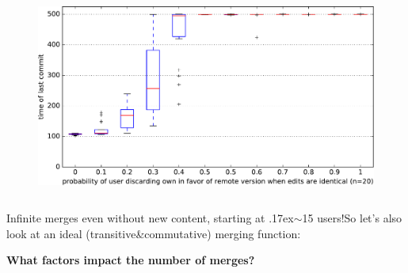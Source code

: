 \documentclass[final,hyperref={pdfpagelabels=false}]{beamer}
\begin{document}
\begin{frame}
\begin{columns}
\begin{column}{.9\textwidth}
\begin{columns}
\begin{column}{.3\textwidth}
\begin{figure}
      \includegraphics[width=\linewidth]{fig/bored_accept_n=20.pdf}
    \end{figure}
  \end{column}

  \end{columns}
  \vspace{10mm}
  \begin{center}
  Infinite merges even without new content, starting at {\raise.17ex\hbox{$\scriptstyle\sim$}}15 users!\hspace{2cm}So let's also look at an ideal (transitive\&commutative) merging function:
  \end{center}

  \vspace{8mm}
  \textbf{What factors impact the number of merges?}
  \vspace{5mm}


\end{column}
\end{columns}
\end{frame}
\end{document}
